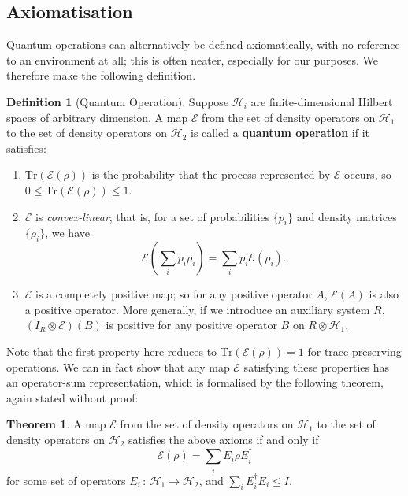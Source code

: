 \documentclass[12pt,a4paper]{report}
\numberwithin{equation}{section}
\newcommand{\tr}{\text{Tr}}
\theoremstyle{definition}
\newtheorem{definition}{Definition}[section]
\theoremstyle{theorem}
\newtheorem{theorem}{Theorem}[section]
\theoremstyle{theorem}
\theoremstyle{example}
\theoremstyle{definition}
\begin{document}
\subsection{Axiomatisation}
Quantum operations can alternatively be defined axiomatically, with no reference to an environment at all; this is often neater, especially for our purposes. We therefore make the following definition.
\begin{definition}[Quantum Operation]
	Suppose $\mathcal{H}_{i}$ are finite-dimensional Hilbert spaces of arbitrary dimension. A map $\mathcal{E}$ from the set of density operators on $\mathcal{H}_{1}$ to the set of density operators on $\mathcal{H}_{2}$ is called a \textbf{quantum operation} if it satisfies:
	\begin{enumerate}
		\item $\text{Tr}(\mathcal{E}(\rho))$ is the probability that the process represented by $\mathcal{E}$ occurs, so $0\leq\text{Tr}(\mathcal{E}(\rho))\leq 1$.
		\item $\mathcal{E}$ is \textit{convex-linear}; that is, for a set of probabilities $\{p_{i}\}$ and density matrices $\{\rho_{i}\}$, we have
		\begin{equation}
			\mathcal{E}\left(\sum_{i}p_{i}\rho_{i}\right)=\sum_{i}p_{i}\mathcal{E}(\rho_{i}).
		\end{equation}
		\item $\mathcal{E}$ is a completely positive map; so for any positive operator $A$, $\mathcal{E}(A)$ is also a positive operator. More generally, if we introduce an auxiliary system $R$, $(I_{R}\otimes \mathcal{E})(B)$ is positive for any positive operator $B$ on $R\otimes\mathcal{H}_{1}$.
	\end{enumerate} 
\end{definition}
Note that the first property here reduces to $\tr(\mathcal{E}(\rho))=1$ for trace-preserving operations. We can in fact show that any map $\mathcal{E}$ satisfying these properties has an operator-sum representation, which is formalised by the following theorem, again stated without proof:
\begin{theorem}
	A map $\mathcal{E}$ from the set of density operators on $\mathcal{H}_{1}$ to the set of density operators on $\mathcal{H}_{2}$ satisfies the above axioms if and only if
	\begin{equation}
		\mathcal{E}(\rho)=\sum_{i}E_{i}\rho E_{i}^{\dagger}
	\end{equation}
	for some set of operators $E_{i}\,:\,\mathcal{H}_{1}\to\mathcal{H}_{2}$, and $\sum_{i}E_{i}^{\dagger}E_{i}\leq I$.
\end{theorem}
\end{document}
